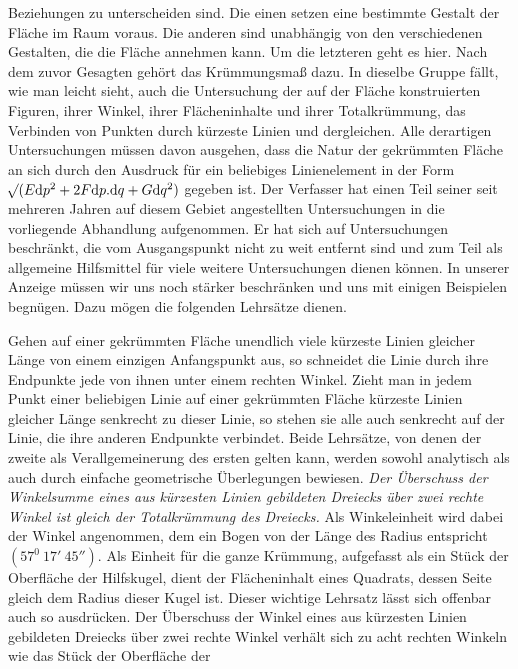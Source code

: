 %
Beziehungen zu unterscheiden sind. Die einen setzen eine bestimmte Gestalt der Fläche im Raum voraus. Die anderen sind unabhängig von den verschiedenen Gestalten, die die Fläche annehmen kann. Um die letzteren geht es hier. Nach dem zuvor Gesagten gehört das Krümmungsmaß dazu. In dieselbe Gruppe fällt, wie man leicht sieht, auch die Untersuchung der auf der Fläche konstruierten Figuren, ihrer Winkel, ihrer Flächeninhalte und ihrer Totalkrümmung, das Verbinden von Punkten durch kürzeste Linien und dergleichen. Alle derartigen Untersuchungen müssen davon ausgehen, dass die Natur der gekrümmten Fläche an sich durch den Ausdruck für ein beliebiges Linienelement in der Form \(\mathord{{}^{}\!\surd}(E\mathrm{d}p^2+2F\mathrm{d}p\mathord{.}\mathrm{d}q+G\mathrm{d}q^2)\) gegeben ist. Der Verfasser hat einen Teil seiner seit mehreren Jahren auf diesem Gebiet angestellten Untersuchungen in die vorliegende Abhandlung aufgenommen. Er hat sich auf Untersuchungen beschränkt, die vom Ausgangspunkt nicht zu weit entfernt sind und zum Teil als allgemeine Hilfsmittel für viele weitere Untersuchungen dienen können. In unserer Anzeige müssen wir uns noch stärker beschränken und uns mit einigen Beispielen begnügen. Dazu mögen die folgenden Lehrsätze dienen.

Gehen auf einer gekrümmten Fläche unendlich viele kürzeste Linien gleicher Länge von einem einzigen Anfangspunkt aus, so schneidet die Linie durch ihre Endpunkte jede von ihnen unter einem rechten Winkel. Zieht man in jedem Punkt einer beliebigen Linie auf einer gekrümmten Fläche kürzeste Linien gleicher Länge senkrecht zu dieser Linie, so stehen sie alle auch senkrecht auf der Linie, die ihre anderen Endpunkte verbindet. Beide Lehrsätze, von denen der zweite als Verallgemeinerung des ersten gelten kann, werden sowohl analytisch als auch durch einfache geometrische Überlegungen bewiesen. \textit{Der Überschuss der Winkelsumme eines aus kürzesten Linien gebildeten Dreiecks über zwei rechte Winkel ist gleich der Totalkrümmung des Dreiecks.} Als Winkeleinheit wird dabei der Winkel angenommen, dem ein Bogen von der Länge des Radius entspricht \((57^0\ 17'\ 45'')\). Als Einheit für die ganze Krümmung, aufgefasst als ein Stück der Oberfläche der Hilfskugel, dient der Flächeninhalt eines Quadrats, dessen Seite gleich dem Radius dieser Kugel ist. Dieser wichtige Lehrsatz lässt sich offenbar auch so ausdrücken. Der Überschuss der Winkel eines aus kürzesten Linien gebildeten Dreiecks über zwei rechte Winkel verhält sich zu acht rechten Winkeln wie das Stück der Oberfläche der %
